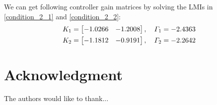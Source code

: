 \documentclass[conference]{IEEEtran}
\begin{document}
We can get following controller gain matrices by solving the LMIs in \eqref{condition_2_1} and \eqref{condition_2_2}:
\begin{equation}\notag
	\begin{aligned}
		K_{1}=\begin{bmatrix}
			-1.0266&-1.2008
		\end{bmatrix},\quad
		\varGamma_{1}=-2.4363 \\
		K_{2}=\begin{bmatrix}
		-1.1812&-0.9191
		\end{bmatrix},\quad
		\varGamma_{2}=-2.2642
	\end{aligned}
\end{equation}





\section*{Acknowledgment}


The authors would like to thank...







%
%
%




\end{document}
